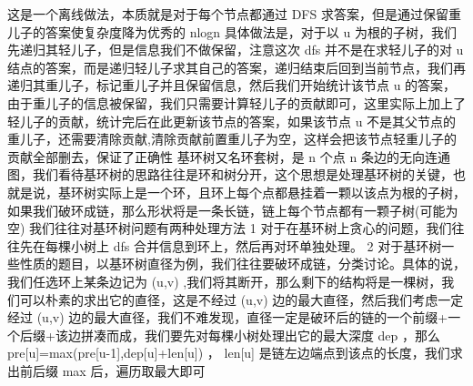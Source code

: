 {}\markdownRendererInterblockSeparator
{}
\markdownRendererSectionEnd \markdownRendererSectionBegin
{}\markdownRendererInterblockSeparator
{}这是一个离线做法，本质就是对于每个节点都通过\markdownRendererDollarSign{} DFS \markdownRendererDollarSign{}求答案，但是通过保留重儿子的答案使复杂度降为优秀的\markdownRendererDollarSign{} nlogn \markdownRendererDollarSign{}\markdownRendererParagraphSeparator
{}具体做法是，对于以\markdownRendererDollarSign{} u \markdownRendererDollarSign{}为根的子树，我们先递归其轻儿子，但是信息我们不做保留，注意这次\markdownRendererDollarSign{} dfs \markdownRendererDollarSign{}并不是在求轻儿子的对\markdownRendererDollarSign{} u \markdownRendererDollarSign{}结点的答案，而是递归轻儿子求其自己的答案，递归结束后回到当前节点，我们再递归其重儿子，标记重儿子并且保留信息，然后我们开始统计该节点\markdownRendererDollarSign{} u \markdownRendererDollarSign{}的答案，由于重儿子的信息被保留，我们只需要计算轻儿子的贡献即可，这里实际上加上了轻儿子的贡献，统计完后在此更新该节点的答案，如果该节点\markdownRendererDollarSign{} u \markdownRendererDollarSign{}不是其父节点的重儿子，还需要清除贡献,清除贡献前置重儿子为空，这样会把该节点轻重儿子的贡献全部删去，保证了正确性\markdownRendererInterblockSeparator
{}\markdownRendererInterblockSeparator
{}
\markdownRendererSectionEnd \markdownRendererSectionBegin
{}\markdownRendererInterblockSeparator
{}基环树又名环套树，是\markdownRendererDollarSign{} n \markdownRendererDollarSign{}个点\markdownRendererDollarSign{} n \markdownRendererDollarSign{}条边的无向连通图，我们看待基环树的思路往往是环和树分开，这个思想是处理基环树的关键，也就是说，基环树实际上是一个环，且环上每个点都悬挂着一颗以该点为根的子树，如果我们破环成链，那么形状将是一条长链，链上每个节点都有一颗子树(可能为空)\markdownRendererParagraphSeparator
{}我们往往对基环树问题有两种处理方法\markdownRendererParagraphSeparator
{}\markdownRendererDollarSign{} 1 \markdownRendererDollarSign{} 对于在基环树上贪心的问题，我们往往先在每棵小树上\markdownRendererDollarSign{} dfs \markdownRendererDollarSign{}合并信息到环上，然后再对环单独处理。\markdownRendererParagraphSeparator
{}\markdownRendererDollarSign{} 2 \markdownRendererDollarSign{}对于基环树一些性质的题目，以基环树直径为例，我们往往要破环成链，分类讨论。具体的说，我们任选环上某条边记为\markdownRendererDollarSign{} (u,v) \markdownRendererDollarSign{},我们将其断开，那么剩下的结构将是一棵树，我们可以朴素的求出它的直径，这是不经过\markdownRendererDollarSign{} (u,v) \markdownRendererDollarSign{}边的最大直径，然后我们考虑一定经过\markdownRendererDollarSign{} (u,v) \markdownRendererDollarSign{}边的最大直径，我们不难发现，直径一定是破环后的链的一个前缀+一个后缀+该边拼凑而成，我们要先对每棵小树处理出它的最大深度\markdownRendererDollarSign{} dep \markdownRendererDollarSign{}，那么\markdownRendererDollarSign{} pre[u]=max(pre[u-1],dep[u]+len[u]) \markdownRendererDollarSign{}，\markdownRendererDollarSign{} len[u] \markdownRendererDollarSign{}是链左边端点到该点的长度，我们求出前后缀\markdownRendererDollarSign{} max \markdownRendererDollarSign{}后，遍历取最大即可\markdownRendererInterblockSeparator

